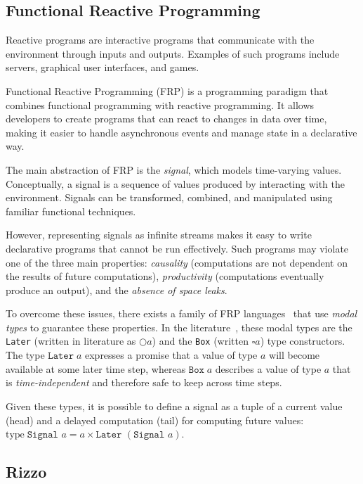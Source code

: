 \subsection{Functional Reactive Programming}\label{section:frp:frp_intro}

Reactive programs are interactive programs that communicate with the environment through inputs and outputs. Examples of such programs include servers, graphical user interfaces, and games.

Functional Reactive Programming (FRP) is a programming paradigm that combines functional programming with reactive programming. It allows developers to create programs that can react to changes in data over time, making it easier to handle asynchronous events and manage state in a declarative way. 

The main abstraction of FRP is the \textit{signal}, which models time-varying values. Conceptually, a signal is a sequence of values produced by interacting with the environment. Signals can be transformed, combined, and manipulated using familiar functional techniques.

However, representing signals as infinite streams makes it easy to write declarative programs that cannot be run effectively. Such programs may violate one of the three main properties: \textit{causality} (computations are not dependent on the results of future computations), \textit{productivity} (computations eventually produce an output), and the \textit{absence of space leaks}. 

To overcome these issues, there exists a family of FRP languages~\cite{neel_krishnaswami_2013,bahr_asynchronous_2023,rizzo_modal_2025} that use \textit{modal types} to guarantee these properties. In the literature~\cite{bahr_asynchronous_2023,rizzo_modal_2025}, these modal types are the \texttt{Later} (written in literature as $\bigcirc a$) and the \texttt{Box} (written $\square a$) type constructors. The type $\texttt{Later}\;a$ expresses a promise that a value of type $a$ will become available at some later time step, whereas $\texttt{Box}\; a$ describes a value of type $a$ that is \textit{time-independent} and therefore safe to keep across time steps.

Given these types, it is possible to define a signal as a tuple of a current value (head) and a delayed computation (tail) for computing future values: $\text{type} \; \texttt{Signal }a = a \times \texttt{Later }(\texttt{Signal }a)$.

\subsection{Rizzo}\label{section:frp:rizzo}

